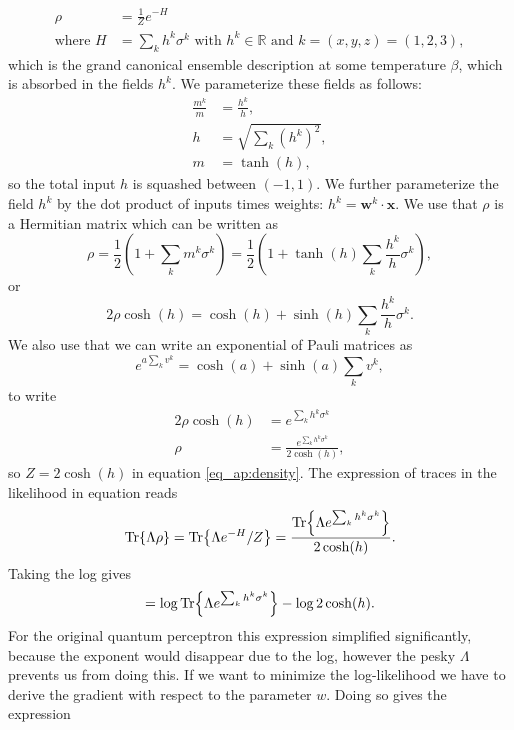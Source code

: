 \begin{align}
    \rho &= \frac{1}{Z} e^{-H}\label{eq_ap:density}\\
    \text{where } H &= \sum_k h^k \sigma^k \text{ with } h^k \in \mathbb{R} \text{ and } k= (x,y,z) = (1,2,3)\nonumber,
\end{align}
which is the grand canonical ensemble description at some temperature $\beta$, which is absorbed in the fields $h^k$. We parameterize these fields as follows:
\begin{align*}
    \frac{m^k}{m} &= \frac{h^k}{h},\\
    h &= \sqrt{\sum_k (h^k)^2},\\
    m &= \tanh(h),
\end{align*}
so the total input $h$ is squashed between $(-1, 1)$. We further parameterize the field $h^k$ by the dot product of inputs times weights: $h^k = \mathbf{w}^k\cdot \mathbf{x}$. We use that $\rho$ is a Hermitian matrix which can be written as
\begin{equation*}
    \rho = \frac{1}{2}(1 + \sum_k m^k\sigma^k) = \frac{1}{2}(1 + \tanh(h) \sum_k \frac{h^k}{h} \sigma^k)
    \label{eq_ap:density_2},
\end{equation*}
or
\begin{equation*}
    2 \rho \cosh(h) = \cosh(h) + \sinh(h) \sum_k \frac{h^k}{h} \sigma^k.
\end{equation*}
We also use that we can write an exponential of Pauli matrices as
\begin{equation*}
    e^{a \sum_k v^k} = \cosh(a) + \sinh(a) \sum_k v^k,
\end{equation*}
to write 
\begin{align*}
    2 \rho \cosh(h) &= e^{\sum_k h^k \sigma^k}\\
    \rho &= \frac{e^{\sum_k h^k \sigma^k}}{2 \cosh(h)},
\end{align*}
so $Z = 2\cosh(h)$ in equation \ref{eq_ap:density}. The expression of traces in the likelihood in equation reads
\begin{equation*}
    \Tr{\Lambda \rho} = \Tr{\Lambda e^{-H} / Z} = \frac{\Tr{\Lambda e^{\sum_k h^k \sigma^k}}}{2 \cosh(h)}.
\end{equation*}
Taking the log gives
\begin{equation}
  = \log\Tr{\Lambda e^{\sum_k h^k \sigma^k}} - \log2 \cosh(h)
  \label{eq_ap:lh_tr}.
\end{equation}
For the original quantum perceptron this expression simplified significantly, because the exponent would disappear due to the log, however the pesky $\Lambda$ prevents us from doing this. If we want to minimize the log-likelihood we have to derive the gradient with respect to the parameter $w$. Doing so gives the expression
